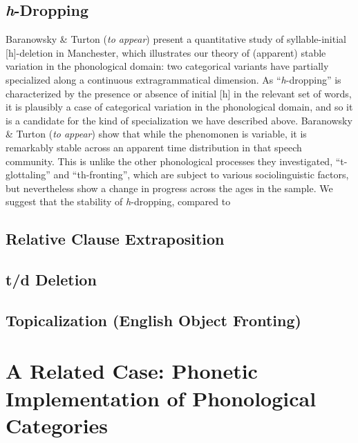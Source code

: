 \subsection{\textsl{h}-Dropping}

Baranowsky \& Turton (\textsl{to appear})  present a quantitative study of syllable-initial [h]-deletion in Manchester, which illustrates our theory of (apparent) stable variation in the phonological domain: two categorical variants have partially specialized along a continuous extragrammatical dimension.
As ``\textsl{h}-dropping'' is characterized by the presence or absence of initial [h] in the relevant set of words, it is plausibly a case of categorical variation in the phonological domain, and so it is a candidate for the kind of specialization we have described above.
Baranowsky \& Turton (\textsl{to appear}) show that while the phenomonen is variable, it is remarkably stable across an apparent time distribution in that speech community.
This is unlike the other phonological processes they investigated, ``t-glottaling'' and ``th-fronting'', which are subject to various sociolinguistic factors, but nevertheless show a change in progress across the ages in the sample.
We suggest that the stability of \textsl{h}-dropping, compared to 


\subsection{Relative Clause Extraposition}
\label{relclause}

\subsection{t/d Deletion}

\subsection{Topicalization (English Object Fronting)}
\label{topsect}

\section{A Related Case: Phonetic Implementation of Phonological Categories}



